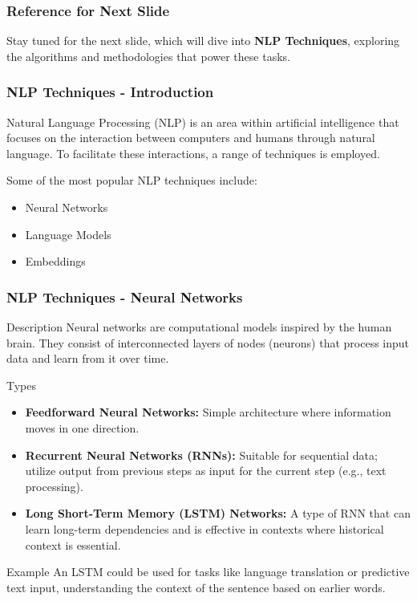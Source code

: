 \documentclass{beamer}
\begin{document}
\begin{frame}[fragile]
    \frametitle{Reference for Next Slide}
    Stay tuned for the next slide, which will dive into \textbf{NLP Techniques}, exploring the algorithms and methodologies that power these tasks.
\end{frame}

\begin{frame}[fragile]
    \frametitle{NLP Techniques - Introduction}
    Natural Language Processing (NLP) is an area within artificial intelligence that focuses on the interaction between computers and humans through natural language. To facilitate these interactions, a range of techniques is employed.
    
    Some of the most popular NLP techniques include:
    \begin{itemize}
        \item Neural Networks
        \item Language Models
        \item Embeddings
    \end{itemize}
\end{frame}

\begin{frame}[fragile]
    \frametitle{NLP Techniques - Neural Networks}
    \begin{block}{Description}
        Neural networks are computational models inspired by the human brain. They consist of interconnected layers of nodes (neurons) that process input data and learn from it over time.
    \end{block}
    
    \begin{block}{Types}
        \begin{itemize}
            \item \textbf{Feedforward Neural Networks:} Simple architecture where information moves in one direction.
            \item \textbf{Recurrent Neural Networks (RNNs):} Suitable for sequential data; utilize output from previous steps as input for the current step (e.g., text processing).
            \item \textbf{Long Short-Term Memory (LSTM) Networks:} A type of RNN that can learn long-term dependencies and is effective in contexts where historical context is essential.
        \end{itemize}
    \end{block}
    
    \begin{block}{Example}
        An LSTM could be used for tasks like language translation or predictive text input, understanding the context of the sentence based on earlier words.
    \end{block}
\end{frame}
\end{document}
